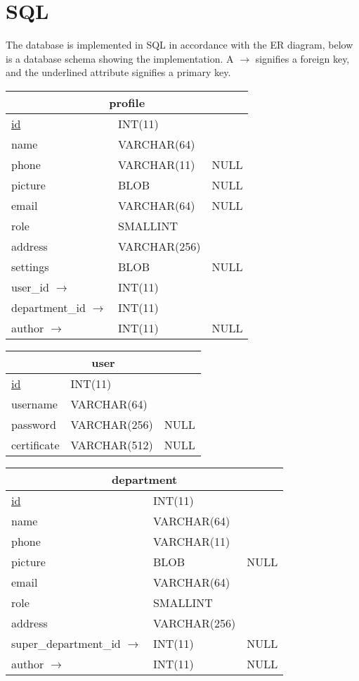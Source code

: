 \section{SQL}
The database is implemented in SQL in accordance with the ER diagram, below is a database schema showing the implementation. A $ \rightarrow $ signifies a foreign key, and the underlined attribute signifies a primary key.

\begin{tabular}{|l|l|c|}
\hline
\multicolumn{3}{|c|}{profile} \\
\hline
\underline{id} & INT(11) & \\
name & VARCHAR(64) & \\
phone & VARCHAR(11) & NULL \\
picture & BLOB & NULL \\
email & VARCHAR(64) & NULL \\ 
role & SMALLINT & \\
address & VARCHAR(256) & \\
settings & BLOB & NULL \\
user\_id $ \rightarrow $ & INT(11) & \\
department\_id $ \rightarrow $ & INT(11) & \\
author $ \rightarrow $ & INT(11) & NULL \\
\hline
\end{tabular}

\vspace{10px}

\begin{tabular}{|l|l|c|}
\hline
\multicolumn{3}{|c|}{user} \\
\hline
\underline{id} & INT(11) & \\
username & VARCHAR(64) & \\
password & VARCHAR(256) & NULL \\
certificate & VARCHAR(512) & NULL \\
\hline
\end{tabular}

\vspace{10pt}

\begin{tabular}{|l|l|c|}
\hline
\multicolumn{3}{|c|}{department} \\
\hline
\underline{id} & INT(11) & \\
name & VARCHAR(64) & \\
phone & VARCHAR(11) & \\
picture & BLOB & NULL \\
email & VARCHAR(64) & \\ 
role & SMALLINT & \\
address & VARCHAR(256) & \\
super\_department\_id $ \rightarrow $& INT(11) & NULL \\
author $ \rightarrow $& INT(11) & NULL \\
\hline
\end{tabular}

